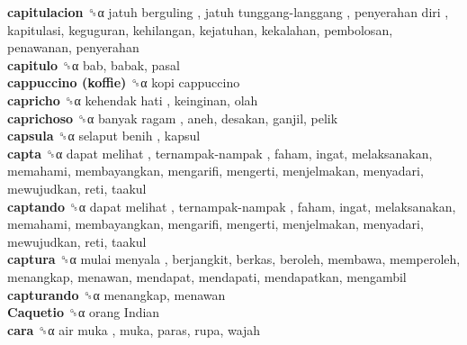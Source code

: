 \textbf{capitulacion} ␝α   jatuh berguling ,  jatuh tunggang-langgang ,  penyerahan diri , kapitulasi, keguguran, kehilangan, kejatuhan, kekalahan, pembolosan, penawanan, penyerahan  \\
\textbf{capitulo} ␝α  bab, babak, pasal  \\
\textbf{cappuccino (koffie)} ␝α   kopi cappuccino   \\
\textbf{capricho} ␝α   kehendak hati , keinginan, olah  \\
\textbf{caprichoso} ␝α   banyak ragam , aneh, desakan, ganjil, pelik  \\
\textbf{capsula} ␝α   selaput benih , kapsul  \\
\textbf{capta} ␝α   dapat melihat ,  ternampak-nampak , faham, ingat, melaksanakan, memahami, membayangkan, mengarifi, mengerti, menjelmakan, menyadari, mewujudkan, reti, taakul  \\
\textbf{captando} ␝α   dapat melihat ,  ternampak-nampak , faham, ingat, melaksanakan, memahami, membayangkan, mengarifi, mengerti, menjelmakan, menyadari, mewujudkan, reti, taakul  \\
\textbf{captura} ␝α   mulai menyala , berjangkit, berkas, beroleh, membawa, memperoleh, menangkap, menawan, mendapat, mendapati, mendapatkan, mengambil  \\
\textbf{capturando} ␝α  menangkap, menawan  \\
\textbf{Caquetio} ␝α   orang Indian   \\
\textbf{cara} ␝α   air muka , muka, paras, rupa, wajah  \\
